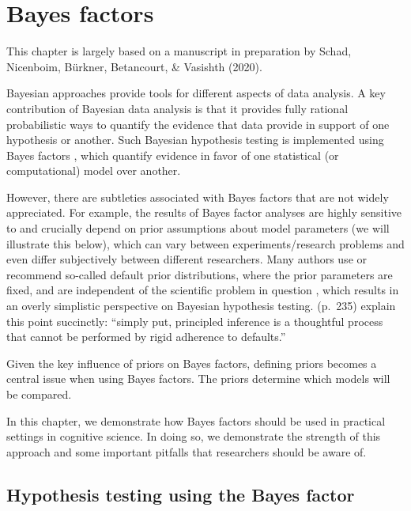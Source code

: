 \documentclass[12pt,]{krantz}
\theoremstyle{definition}
\theoremstyle{definition}
\theoremstyle{definition}
\theoremstyle{remark}
\begin{document}
\hypertarget{ch:bf}{%
\chapter{Bayes factors}\label{ch:bf}}

This chapter is largely based on a manuscript in preparation by Schad, Nicenboim, Bürkner, Betancourt, \& Vasishth (2020).

Bayesian approaches provide tools for different aspects of data analysis. A key contribution of Bayesian data analysis is that it provides fully rational probabilistic ways to quantify the evidence that data provide in support of one hypothesis or another. Such Bayesian hypothesis testing is implemented using Bayes factors \citep{rouder2018bayesian, schonbrodt2018bayes, wagenmakers2010BayesianHypothesisTesting, kass1995bayes, gronau2017tutorial, jeffreys1939theory}, which quantify evidence in favor of one statistical (or computational) model over another.

However, there are subtleties associated with Bayes factors that are not widely appreciated. For example, the results of Bayes factor analyses are highly sensitive to and crucially depend on prior assumptions about model parameters (we will illustrate this below), which can vary between experiments/research problems and even differ subjectively between different researchers. Many authors use or recommend so-called default prior distributions, where the prior parameters are fixed, and are independent of the scientific problem in question \citep{hammerly2019grammaticality, navarro2015learning}, which results in an overly simplistic perspective on Bayesian hypothesis testing. \citet{rouder2009bayesian} (p.~235) explain this point succinctly: ``simply put, principled inference is a thoughtful process that cannot be performed by rigid adherence to defaults.''

Given the key influence of priors on Bayes factors, defining priors becomes a central issue when using Bayes factors. The priors determine which models will be compared.

In this chapter, we demonstrate how Bayes factors should be used in practical settings in cognitive science. In doing so, we demonstrate the strength of this approach and some important pitfalls that researchers should be aware of.

\hypertarget{hypothesis-testing-using-the-bayes-factor}{%
\section{Hypothesis testing using the Bayes factor}\label{hypothesis-testing-using-the-bayes-factor}}
\end{document}
